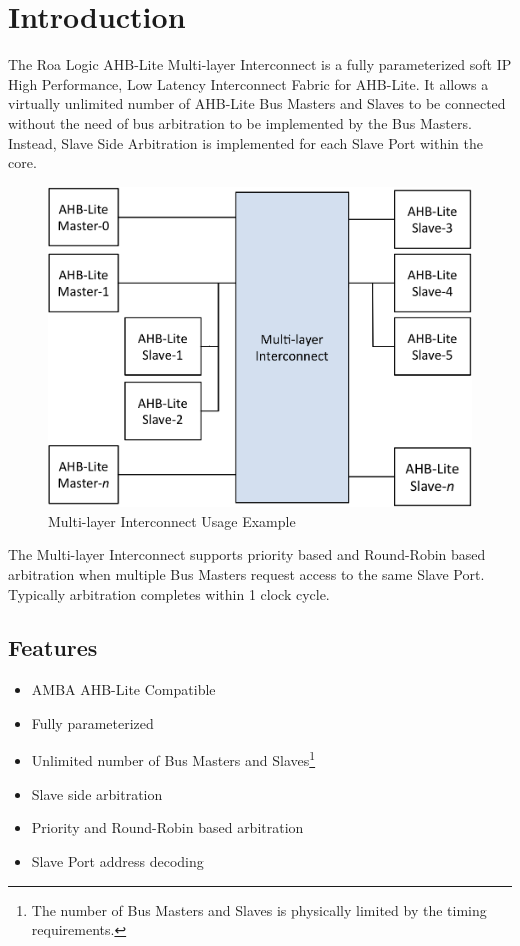 \chapter{Introduction}\label{introduction}

The Roa Logic AHB-Lite Multi-layer Interconnect is a fully parameterized
soft IP High Performance, Low Latency Interconnect Fabric for AHB-Lite.
It allows a virtually unlimited number of AHB-Lite Bus Masters and
Slaves to be connected without the need of bus arbitration to be
implemented by the Bus Masters. Instead, Slave Side Arbitration is
implemented for each Slave Port within the core.

\begin{figure}[tbh]
	\centering
	\includegraphics{assets/img/ahb-lite-switch-sys.png}
	\caption{Multi-layer Interconnect Usage Example}
	\label{fig:ahb-lite-switch-sys}
\end{figure}

The Multi-layer Interconnect supports priority based and Round-Robin based
arbitration when multiple Bus Masters request access to the same Slave
Port. Typically arbitration completes within 1 clock cycle.

\section{Features}\label{features}

\begin{itemize}
\item
  AMBA AHB-Lite Compatible
\item
  Fully parameterized
\item
  Unlimited number of Bus Masters and Slaves\footnote{The number of Bus
    Masters and Slaves is physically limited by the timing requirements.}
\item
  Slave side arbitration
\item
  Priority and Round-Robin based arbitration
\item
  Slave Port address decoding
\end{itemize}
